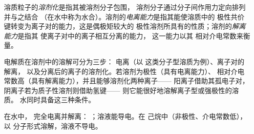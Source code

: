 \begin{definition}\label{def:b1:intermolecular-forces-solvents:dissolution}
溶质粒子的\emph{溶剂化}是指其被溶剂分子包围，
溶剂分子通过分子间作用力定向排列并与之结合
（在水中称为水合）。溶剂的\emph{电离能力}是指其能使溶质中的
极性共价键转变为离子对的能力，这是偶极矩较大的
极性溶剂所具有的性质；溶剂的\emph{解离能力}是指其
使离子对中的离子相互分离的能力，
这一能力以其
相对介电常数来衡量。
\end{definition}

\begin{proposition}[分三步溶解]\label{prop:b1:intermolecular-forces-solvents:steps}
电解质在溶剂中的溶解可分为三步：
电离（以  这类分子型溶质为例）、离子对的解离，
以及分离后的离子的溶剂化。若溶剂为极性（具有电离能力）、
相对介电常数高（具有解离能力），并且能够溶剂化两种离子——
阳离子借助其孤电子对，阴离子若为质子性溶剂则借助氢键——
则它能很好地溶解离子型或强极性的溶质。
水同时具备这三种条件。
\end{proposition}

\begin{example}[氯化氢在水中与在己烷中]\label{ex:b1:intermolecular-forces-solvents:hcl}
在水中， 完全电离并解离：
；溶液能导电。在
己烷中（非极性、介电常数低）， 以
分子形式溶解，溶液不导电。
\end{example}

